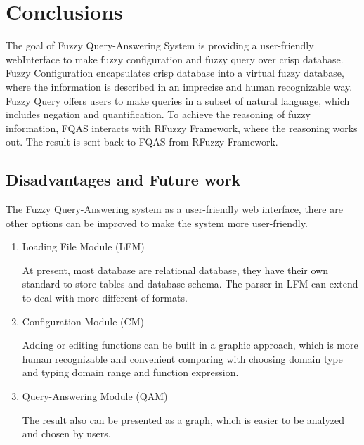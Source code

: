 \documentclass[main.tex]{subfiles}
\begin{document}
\newpage
\section{Conclusions}
\label{sec:Conclusions}
The goal of  Fuzzy Query-Answering System is providing a user-friendly webInterface to make fuzzy configuration and fuzzy query over crisp database. Fuzzy Configuration encapsulates crisp database into a virtual fuzzy database, where the information is described in an imprecise and human recognizable way. Fuzzy Query offers users to make queries in a subset of natural language, which includes negation and quantification. To achieve the reasoning of fuzzy information, FQAS interacts with RFuzzy Framework, where the reasoning works out. The result is sent back to FQAS from RFuzzy Framework.

\subsection{Disadvantages and Future work}
The Fuzzy Query-Answering system as a user-friendly web interface, there are other options can be improved to make the system more user-friendly.
\begin{enumerate}
\item Loading File Module (LFM)

At present, most database are relational database, they have their own standard to store tables and database schema. The parser in LFM can extend to deal with more different of formats.
 
\item Configuration Module (CM)

Adding or editing functions can be built in a graphic approach, which is more human recognizable and convenient comparing with choosing domain type and typing domain range and function expression.

\item Query-Answering Module (QAM)

The result also can be presented as a graph, which is easier to be analyzed and chosen by users. 

\end{enumerate}
\end{document}
